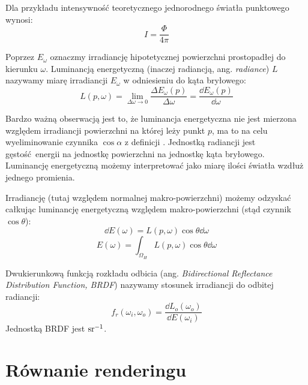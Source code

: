 \documentclass[../main.tex]{subfiles}
\begin{document}
Dla przykładu intensywność teoretycznego jednorodnego światła punktowego wynosi:
\begin{equation}
  I = \frac{\Phi}{4\pi}
\label{eq:pbr_intensity_of_point_light}
\end{equation}

Poprzez $E_{\omega}$ oznaczmy irradiancję hipotetycznej powierzchni
prostopadłej do kierunku $\omega$. Luminancją energetyczną (inaczej radiancją, ang. \textit{radiance}) $L$ nazywamy miarę irradiancji $E_{\omega}$ w odniesieniu do kąta bryłowego:
\begin{equation}
L(p, \omega) = \lim_{\Delta\omega \rightarrow 0} {
  \frac{\Delta E_{\omega} (p)}{\Delta\omega}
} =
\frac{\dd E_{\omega}(p)}{\dd \omega}
\label{eq:pbr_radiance}
\end{equation}

Bardzo ważną obserwacją jest to, że luminancja energetyczna nie jest mierzona względem irradiancji powierzchni na której leży punkt $p$, ma to na celu wyeliminowanie czynnika $\cos \alpha$ z definicji \cite[str. 339]{pbrt}. Jednostką radiancji jest gęstość energii na jednostkę powierzchni na jednostkę kąta bryłowego. Luminancję energetyczną możemy interpretować jako miarę ilości światła wzdłuż jednego promienia.

Irradiancję (tutaj względem normalnej makro-powierzchni) możemy odzyskać całkując luminancję energetyczną względem makro-powierzchni (stąd czynnik $\cos\theta$):
\begin{equation}
    \dd E(\omega) = L(p, \omega) \cos\theta \dd \omega
    \label{eq:pbr_irradiance_from_radiance}
\end{equation}
\begin{equation}
    E(\omega) = \int_{\Omega_H}{L(p, \omega) \cos\theta \dd \omega}
\end{equation}

Dwukierunkową funkcją rozkładu odbicia (ang. \textit{Bidirectional Reflectance Distribution Function, BRDF}) nazywamy stosunek irradiancji do odbitej radiancji:
\begin{equation}
f_r(\omega_i, \omega_o) = \frac{
    \dd L_{o}(\omega_o)
}{
    \dd E(\omega_i)
}
\label{eq:pbr_brdf}
\end{equation}
\noindent Jednostką BRDF jest $\si[per-mode=reciprocal]{\per\steradian}$.

\section{Równanie renderingu}
\end{document}
